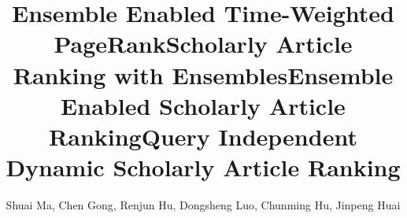 \documentclass[sigconf]{acmart}
\newcommand{\eat}[1]{}
\begin{document}
\title{Ensemble Enabled Time-Weighted PageRank}


\title{Scholarly Article Ranking with Ensembles}



\title{Ensemble Enabled Scholarly Article Ranking}


\title{Query Independent Dynamic Scholarly Article Ranking}



\author{
Shuai Ma, Chen Gong, Renjun Hu, Dongsheng Luo, Chunming Hu, Jinpeng Huai}



\eat{
\author{Shuai Ma}
\affiliation{%
  \institution{SKLSDE Lab, Beihang University}
}
\email{mashuai@buaa.edu.cn}
\author{Chen Gong}
\affiliation{%
  \institution{SKLSDE Lab, Beihang University}
}
\email{gongchen@buaa.edu.cn}

\author{Renjun Hu}
\affiliation{%
  \institution{SKLSDE Lab, Beihang University}
}
\email{hurenjun@buaa.edu.cn}

\author{Dongsheng Luo}
\affiliation{%
  \institution{SKLSDE Lab, Beihang University}
}
\email{lds1995@buaa.edu.cn}

\author{Chunming Hu}
\affiliation{%
  \institution{SKLSDE Lab, Beihang University}
}
\email{hucm@buaa.edu.cn}

\author{Jinpeng Huai}
\affiliation{%
  \institution{SKLSDE Lab, Beihang University}
}
\email{huaijp@buaa.edu.cn}
}


\renewcommand{\shortauthors}{S. Ma, C. Gong, R. Hu et al.}
\end{document}
